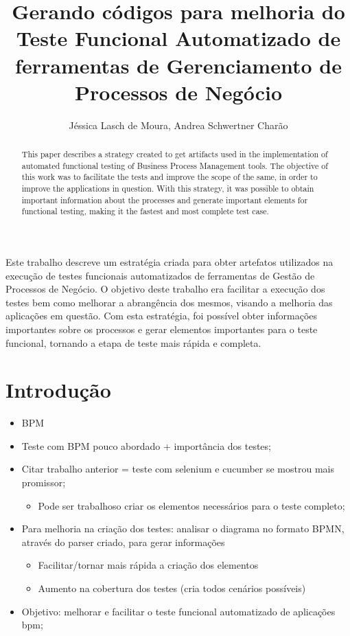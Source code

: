 \documentclass[12pt]{article}
\title{Gerando códigos para melhoria do Teste Funcional Automatizado de ferramentas de Gerenciamento de Processos de Negócio}
\author{Jéssica Lasch de Moura\inst{1}, Andrea Schwertner Charão\inst{1}}
\begin{document}
 

\maketitle

\begin{abstract}
This paper describes a strategy created to get artifacts used in the implementation of automated functional testing of Business Process Management tools. The objective of this work was to facilitate the tests and improve the scope of the same, in order to improve the applications in question. With this strategy, it was possible to obtain important information about the processes and generate important elements for functional testing, making it the fastest and most complete test case.
\end{abstract}
     
\begin{resumo} 
Este trabalho descreve um estratégia criada para obter artefatos utilizados na execução de testes funcionais automatizados de ferramentas de Gestão de Processos de Negócio. O objetivo deste trabalho era facilitar a execução dos testes bem como melhorar a abrangência dos mesmos, visando a melhoria das aplicações em questão. Com esta estratégia, foi possível obter informações importantes sobre os processos e gerar elementos importantes para o teste funcional, tornando a etapa de teste mais rápida e completa.
\end{resumo}

\section{Introdução}

 \begin{itemize}
   \item BPM
   \item Teste com BPM pouco abordado + importância dos testes;
   \item Citar trabalho anterior = teste com selenium e cucumber se mostrou mais promissor;
   \begin{itemize}
	\item Pode ser trabalhoso criar os elementos necessários para o teste completo;
   \end{itemize}
   \item Para melhoria na criação dos testes: analisar o diagrama no formato BPMN, através do parser criado, para gerar informações
     \begin{itemize}
	\item Facilitar/tornar mais rápida a criação dos elementos
	\item Aumento na cobertura dos testes (cria todos cenários possíveis)
   \end{itemize}
   \item Objetivo:  melhorar e facilitar o teste funcional automatizado de aplicações bpm;
 \end{itemize}
 
\end{document}
